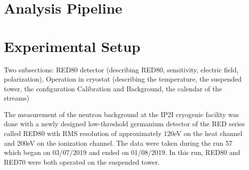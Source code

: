 \section{Analysis Pipeline}


\section{Experimental Setup}

{\color{red} Two subsections: RED80 detector (describing RED80, sensitivity, electric field, polarization), Operation in cryostat (describing the temperature, the suspended tower, the configuration Calibration and Background, the calendar of the streams)}

The measurement of the neutron background at the IP2I cryogenic facility was done with a newly designed low-threshold germanium detector of the RED series called RED80 with RMS resolution of approximately 120eV on the heat channel and 200eV on the ionization channel.
The data were taken during the run 57 which began on 03/07/2019 and ended on 01/08/2019. In this run, RED80 and RED70 were both operated on the suspended tower.

